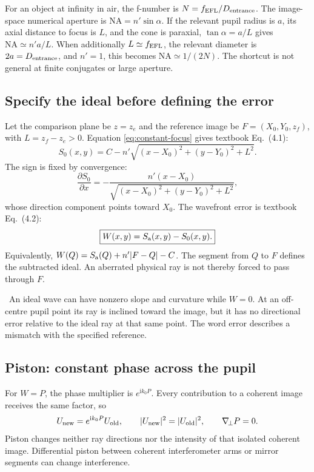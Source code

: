 \documentclass[11pt,a4paper]{article}
\numberwithin{equation}{section}
\newcommand{\ii}{\mathrm{i}}
\newcommand{\gradp}{\nabla_{\!\perp}}
\newcommand{\note}[1]{\par\smallskip\noindent{\color{accent}\textbf{Interpretation.}}\ #1\par\smallskip}
\begin{document}
For an object at infinity in air, the f-number is
$N=f_{\rm EFL}/D_{\rm entrance}$.
The image-space numerical aperture is $\mathrm{NA}=n'\sin\alpha$.
If the relevant pupil radius is $a$, its axial distance to focus is $L$,
and the cone is paraxial, $\tan\alpha=a/L$ gives
$\mathrm{NA}\simeq n'a/L$.
When additionally $L\simeq f_{\rm EFL}$, the relevant diameter is
$2a=D_{\rm entrance}$, and $n'=1$, this becomes
$\mathrm{NA}\simeq1/(2N)$. The shortcut is not general at finite conjugates
or large aperture.

\subsection{Specify the ideal before defining the error}
Let the comparison plane be $z=z_e$ and the reference image be
$F=(X_0,Y_0,z_f)$, with $L=z_f-z_e>0$.
Equation \eqref{eq:constant-focus} gives textbook Eq.~(4.1):
\begin{equation}
 S_0(x,y)=C-n'\sqrt{(x-X_0)^2+(y-Y_0)^2+L^2}.
 \label{eq:ideal}
\end{equation}
The sign is fixed by convergence:
\[
 \frac{\partial S_0}{\partial x}
 =-\frac{n'(x-X_0)}
 {\sqrt{(x-X_0)^2+(y-Y_0)^2+L^2}},
\]
whose direction component points toward $X_0$.
The wavefront error is textbook Eq.~(4.2):
\begin{equation}
 \boxed{W(x,y)=S_{\rm a}(x,y)-S_0(x,y).}
 \label{eq:opd}
\end{equation}
Equivalently, $W(Q)=S_{\rm a}(Q)+n'|F-Q|-C$.
The segment from $Q$ to $F$ defines the subtracted ideal. An aberrated
physical ray is not thereby forced to pass through $F$.

\note{An ideal wave can have nonzero slope and curvature while $W=0$.
At an off-centre pupil point its ray is inclined toward the image, but it
has no directional error relative to the ideal ray at that same point.
The word error describes a mismatch with the specified reference.}

\subsection{Piston: constant phase across the pupil}
For $W=P$, the phase multiplier is $e^{\ii k_0P}$.
Every contribution to a coherent image receives the same factor, so
\[
 U_{\rm new}=e^{\ii k_0P}U_{\rm old},\qquad
 |U_{\rm new}|^2=|U_{\rm old}|^2,\qquad \gradp P=0.
\]
Piston changes neither ray directions nor the intensity of that isolated
coherent image. Differential piston between coherent interferometer arms or
mirror segments can change interference.
\end{document}
